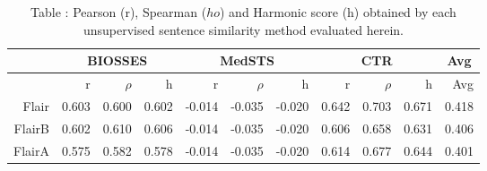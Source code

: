 

\begin{table}[!h]
\centering
\caption{Table \label{table:BioSentenceSimFinalRawOutputFiles}: Pearson (r), Spearman ($
ho$) and Harmonic score (h) obtained by each unsupervised sentence similarity method evaluated herein.} 
\begingroup\tiny
\begin{tabular}{rrrrrrrrrrr}
  \hline \multicolumn{1}{c}{ } & \multicolumn{3}{c}{BIOSSES} & \multicolumn{3}{c}{MedSTS} & \multicolumn{3}{c}{CTR} & \multicolumn{1}{c}{Avg} \\  \hline
 & r & $\rho$ & h & r & $\rho$ & h & r & $\rho$ & h & Avg \\ 
  \hline
Flair & 0.603 & 0.600 & 0.602 & -0.014 & -0.035 & -0.020 & 0.642 & 0.703 & 0.671 & 0.418 \\ 
  FlairB & 0.602 & 0.610 & 0.606 & -0.014 & -0.035 & -0.020 & 0.606 & 0.658 & 0.631 & 0.406 \\ 
  FlairA & 0.575 & 0.582 & 0.578 & -0.014 & -0.035 & -0.020 & 0.614 & 0.677 & 0.644 & 0.401 \\ 
   \hline
\end{tabular}
\endgroup
\end{table}
